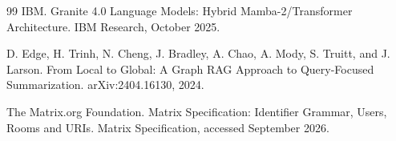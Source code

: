 \documentclass[11pt]{article}
\begin{document}
\begin{thebibliography}{99}
IBM.
\newblock Granite 4.0 Language Models: Hybrid Mamba-2/Transformer Architecture.
\newblock IBM Research, October 2025.

D. Edge, H. Trinh, N. Cheng, J. Bradley, A. Chao, A. Mody, S. Truitt, and J. Larson.
\newblock From Local to Global: A Graph RAG Approach to Query-Focused Summarization.
\newblock arXiv:2404.16130, 2024.

The Matrix.org Foundation.
\newblock Matrix Specification: Identifier Grammar, Users, Rooms and URIs.
\newblock Matrix Specification, accessed September 2026.

\end{thebibliography}
\end{document}
